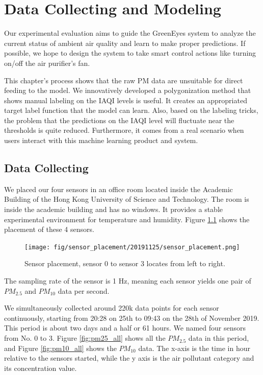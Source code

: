 \chapter{Data Collecting and Modeling}\label{chap:data_collecting_modeling}
Our experimental evaluation aims to guide the GreenEyes system to analyze the current status of ambient air quality and learn to make proper predictions. If possible, we hope to design the system to take smart control actions like turning on/off the air purifier's fan.

This chapter's process shows that the raw PM data are unsuitable for direct feeding to the model. We innovatively developed a polygonization method that shows manual labeling on the IAQI levels is useful. It creates an appropriated target label function that the model can learn. Also, based on the labeling tricks, the problem that the predictions on the IAQI level will fluctuate near the thresholds is quite reduced. Furthermore, it comes from a real scenario when users interact with this machine learning product and system.

\section{Data Collecting}

We placed our four sensors in an office room located inside the Academic Building of the Hong Kong University of Science and Technology. The room is inside the academic building and has no windows. It provides a stable experimental environment for temperature and humidity. Figure \ref{fig:sensor_placement} shows the placement of these 4 sensors.

\begin{figure}[!htbp]
    \begin{center}
    \texttt{[image: fig/sensor\_placement/20191125/sensor\_placement.png]}
    \end{center}
    \caption{Sensor placement, sensor 0 to sensor 3 locates from left to right.}
    \label{fig:sensor_placement}
\end{figure}

The sampling rate of the sensor is 1 Hz, meaning each sensor yields one pair of $PM_{2.5}$ and $PM_{10}$ data per second.

We simultaneously collected around 220k data points for each sensor continuously, starting from 20:28 on 25th to 09:43 on the 28th of November 2019. This period is about two days and a half or 61 hours. We named four sensors from No. 0 to 3. Figure \ref{fig:pm25_all} shows all the $PM_{2.5}$ data in this period, and Figure \ref{fig:pm10_all} shows the $PM_{10}$ data. The x-axis is the time in hour relative to the sensors started, while the y axis is the air pollutant category and its concentration value.


